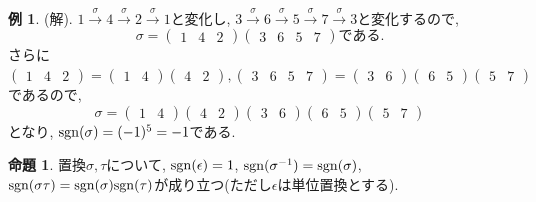 \documentclass[dvipdfmx,a4paper,11pt]{article}
\newcommand{\sgn}{{\rm sgn}}
\theoremstyle{definition}
\newtheorem{prop}[thm]{命題}
\newtheorem{exa}[thm]{例}
\begin{document}
\begin{exa}
 (解). 
 $1 \overset{\sigma}{\rightarrow} 4 \overset{\sigma}{\rightarrow}2 \overset{\sigma}{\rightarrow}1 $と変化し,  
  $3 \overset{\sigma}{\rightarrow} 6\overset{\sigma}{\rightarrow}5 \overset{\sigma}{\rightarrow}7 \overset{\sigma}{\rightarrow}3$と変化するので, 
  $$
  \sigma = 
   \begin{pmatrix}
 1& 4 &2 
 \end{pmatrix} 
    \begin{pmatrix}
 3& 6 &5 &7
 \end{pmatrix} 
 \text{である.}
  $$
  さらに
  $   \begin{pmatrix}
 1& 4 &2 
 \end{pmatrix} 
 = 
 \begin{pmatrix}
 1& 4  
 \end{pmatrix} 
 \begin{pmatrix}
 4 &2 
 \end{pmatrix},
\begin{pmatrix}
 3& 6 &5 &7
 \end{pmatrix} 
 =
 \begin{pmatrix}
 3& 6  
 \end{pmatrix} 
  \begin{pmatrix}
 6& 5  
 \end{pmatrix} 
  \begin{pmatrix}
 5& 7  
 \end{pmatrix} 
 $
 であるので, 
 $$
\sigma= 
\begin{pmatrix}
 1& 4  
 \end{pmatrix} 
 \begin{pmatrix}
 4 &2 
 \end{pmatrix}
 \begin{pmatrix}
 3& 6  
 \end{pmatrix} 
  \begin{pmatrix}
 6& 5  
 \end{pmatrix} 
  \begin{pmatrix}
 5& 7  
 \end{pmatrix} 
 $$
 となり, $\sgn(\sigma)= (-1)^{5}=-1$である.
 
 \end{exa}

  \begin{tcolorbox}[
    colback = white,
    colframe = green!35!black,
    fonttitle = \bfseries,
    breakable = true]
    \begin{prop}置換$\sigma, \tau$について, 
    $\sgn(\epsilon) = 1$, $\sgn(\sigma^{-1}) = \sgn(\sigma)$, 
$\sgn(\sigma \tau) = \sgn(\sigma) \sgn(\tau) $が成り立つ(ただし$\epsilon$は単位置換とする).
  \end{prop}
 \end{tcolorbox}
 
\end{document}
